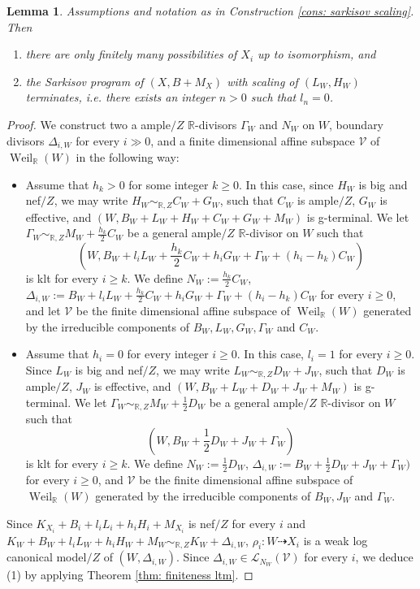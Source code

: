 \documentclass[11pt]{amsart}
\numberwithin{equation}{section}
\newcommand{\Rr}{\mathbb{R}}
\newcommand{\Weil}{\operatorname{Weil}}
\newtheorem{lem}[thm]{Lemma}
\theoremstyle{definition}
\theoremstyle{remark}
\theoremstyle{definition}
\begin{document}
\begin{lem}\label{lem: sarkisov scaling terminate}
Assumptions and notation as in Construction \ref{cons: sarkisov scaling}. Then
\begin{enumerate}
    \item there are only finitely many possibilities of $X_i$ up to isomorphism, and
    \item the Sarkisov program of $(X,B+M_X)$ with scaling of $(L_W,H_W)$ terminates, i.e. there exists an integer $n>0$ such that $l_n=0$.
\end{enumerate}
\end{lem}
\begin{proof}
We construct two a ample$/Z$ $\Rr$-divisors $\Gamma_W$ and $N_W$ on $W$, boundary divisors $\Delta_{i,W}$ for every $i\gg 0$, and a finite dimensional affine subspace $\mathcal{V}$ of $\Weil_{\Rr}(W)$ in the following way:
\begin{itemize}
    \item Assume that $h_k>0$ for some integer $k\geq 0$. In this case, since $H_W$ is big and nef$/Z$, we may write $H_W\sim_{\Rr,Z}C_W+G_W$, such that $C_W$ is ample$/Z$, $G_W$ is effective, and $(W,B_W+L_W+H_W+C_W+G_W+M_W)$ is g-terminal. We let $\Gamma_W\sim_{\Rr,Z}M_W+\frac{h_k}{2}C_W$ be a general ample$/Z$ $\Rr$-divisor on $W$ such that 
    $$(W,B_W+l_iL_W+\frac{h_k}{2}C_W+h_iG_W+\Gamma_W+(h_i-h_k)C_W)$$ 
    is klt for every $i\geq k$. We define $N_W:=\frac{h_k}{2}C_W$, $\Delta_{i,W}:=B_W+l_iL_W+\frac{h_k}{2}C_W+h_iG_W+\Gamma_W+(h_i-h_k)C_W$ for every $i\geq 0$, and let $\mathcal{V}$ be the finite dimensional affine subspace of $\Weil_{\Rr}(W)$ generated by the irreducible components of $B_W,L_W,G_W,\Gamma_W$ and $C_W$.
    \item Assume that $h_i=0$ for every integer $i\geq 0$. In this case, $l_i=1$ for every $i\geq 0$. Since $L_W$ is big and nef$/Z$, we may write $L_W\sim_{\Rr,Z}D_W+J_W$, such that $D_W$ is ample$/Z$, $J_W$ is effective, and $(W,B_W+L_W+D_W+J_W+M_W)$ is g-terminal.  We let $\Gamma_W\sim_{\Rr,Z}M_W+\frac{1}{2}D_W$ be a general ample$/Z$ $\Rr$-divisor on $W$ such that 
     $$(W,B_W+\frac{1}{2}D_W+J_W+\Gamma_W)$$ 
    is klt for every $i\geq k$. We define $N_W:=\frac{1}{2}D_W$, $\Delta_{i,W}:=B_W+\frac{1}{2}D_W+J_W+\Gamma_W)$ for every $i\geq 0$, and $\mathcal{V}$ be the finite dimensional affine subspace of $\Weil_{\Rr}(W)$ generated by the irreducible components of $B_W,J_W$ and $\Gamma_W$.
\end{itemize}
Since  $K_{X_i}+B_i+l_iL_i+h_iH_i+M_{X_i}$ is nef$/Z$ for every $i$ and $K_{W}+B_W+l_iL_W+h_iH_W+M_W\sim_{\Rr,Z}K_W+\Delta_{i,W}$, $\rho_i: W\dashrightarrow X_i$ is a weak log canonical model$/Z$ of $(W,\Delta_{i,W})$. Since $\Delta_{i,W}\in\mathcal{L}_{N_W}(\mathcal{V})$ for every $i$, we deduce (1) by applying Theorem \ref{thm: finiteness ltm}.


\end{proof}
\end{document}
